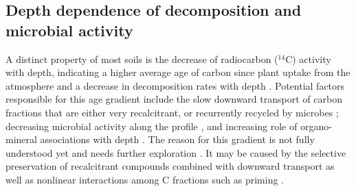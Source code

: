 \documentclass[11pt, oneside, a4paper]{article}   	%
\begin{document}


\subsection{Depth dependence of decomposition and microbial activity}

A distinct property of most soils is the decrease of radiocarbon ($^{14}$C) activity with
depth, indicating a higher average age of carbon since plant uptake from the atmosphere and a decrease in decomposition rates with depth \citep{Mathieu2015, He2016, Lawrence2020, Rumpel2011, Heckman2022, Scheibe2023, HicksPries2023}. Potential factors responsible for this age gradient include the slow
downward transport of carbon fractions that are either very recalcitrant, or recurrently recycled by microbes \citep{Elzein1995, Gleixner2013, Kaiser2012, Roth2019};
decreasing microbial activity along
the profile \citep{Jenkinson2008, Persson2000, Koven2013BGS, Wang2021}, and increasing role of organo-mineral associations with depth \citep{Rumpel2011, Eusterhues2003, Rasmussen2018, Cotrufo2022, Georgiou2022, HicksPries2023}. The reason for this gradient is not fully understood
yet and needs further exploration \citep{Guo2023}. It may be caused by the selective preservation of recalcitrant compounds combined with downward transport \citep{Elzein1995, Luo2020} as well as nonlinear interactions among C fractions such as priming \citep{Guenet2013, Liang2018, Wang2021}. 
\end{document}
